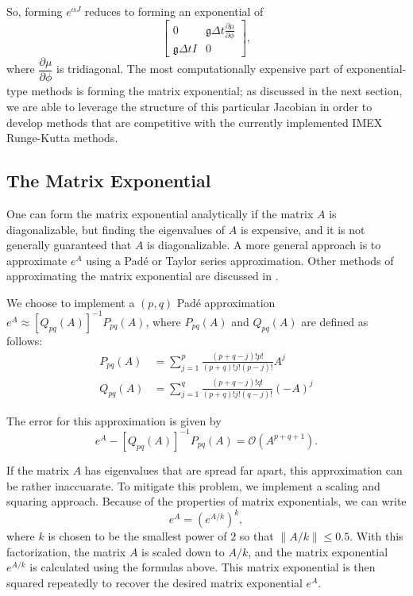\documentclass{csri19}
\newcommand{\CFKg}{\mathfrak{g}}
\begin{document}
So, forming $e^{\alpha J}$ reduces to forming an exponential of 
\[ \begin{bmatrix}
   0              & \CFKg \Delta t \frac{\partial \mu}{\partial \phi} \\
 \CFKg \Delta t I & 0  \end{bmatrix},\]
where $\dfrac{\partial \mu}{\partial \phi}$ is tridiagonal. The most computationally expensive part of exponential-type methods is forming the matrix exponential; 
as discussed in the next section, we are able to leverage the structure of this particular Jacobian in order to develop methods that are competitive with the currently implemented IMEX Runge-Kutta methods.

\subsection{The Matrix Exponential}\label{CFK:sec:matexp} 
One can form the matrix exponential analytically if the matrix $A$ is diagonalizable, but finding the eigenvalues of $A$ is expensive, and it is not generally guaranteed that $A$ is diagonalizable.
A more general approach is to approximate $e^{A}$ using a Pad\'e or Taylor series approximation. Other methods of approximating the matrix exponential are discussed in \cite{CFK:Moler2003}.

We choose to implement a $(p,q)$ Pad\'e approximation $e^{A}\approx \left[Q_{pq}(A)\right]^{-1}P_{pq}(A)$, where $P_{pq}(A)$ and $Q_{pq}(A)$ are defined as follows:
\begin{align*}
P_{pq}(A) &= \sum_{j=1}^p\frac{(p+q-j)!p!}{(p+q)!j!(p-j)!}A^j\\
Q_{pq}(A) &= \sum_{j=1}^q\frac{(p+q-j)!q!}{(p+q)!j!(q-j)!}(-A)^j
\end{align*}

The error for this approximation is given by
\[ e^A - \left[Q_{pq}(A)\right]^{-1}P_{pq}(A) = \mathcal{O}(A^{p+q+1}).\]

If the matrix $A$ has eigenvalues that are spread far apart, this approximation can be rather inaccuarate. 
To mitigate this problem, we implement a scaling and squaring approach. Because of the properties of matrix exponentials, we can write
\[e^{A} = \left(e^{A/k}\right)^k,\]
where $k$ is chosen to be the smallest power of $2$ so that $\|A/k\| \leq 0.5$.
With this factorization, the matrix $A$ is scaled down to $A/k$, and the matrix exponential $e^{A/k}$ is calculated using the formulas above. This matrix exponential is then squared repeatedly to recover the desired matrix exponential $e^{A}$.
\end{document}
